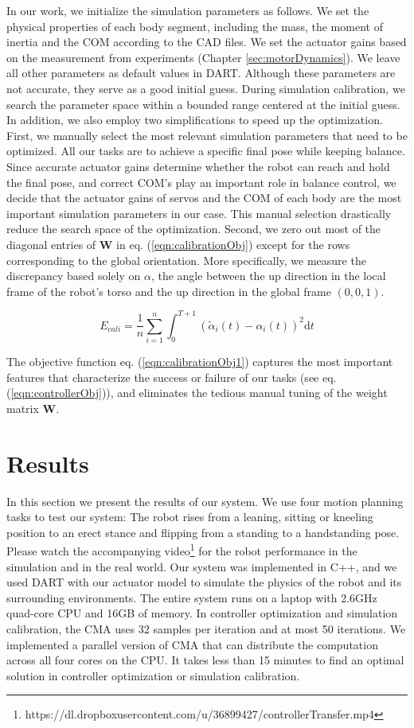 In our work, we initialize the simulation parameters as follows. We set the physical properties of each body segment, including the mass, the moment of inertia and the COM according to the CAD files. We set the actuator gains based on the measurement from experiments (Chapter \ref{sec:motorDynamics}). We leave all other parameters as default values in DART. Although these parameters are not accurate, they serve as a good initial guess. During simulation calibration, we search the parameter space within a bounded range centered at the initial guess. In addition, we also employ two simplifications to speed up the optimization. First, we manually select the most relevant simulation parameters that need to be optimized. All our tasks are to achieve a specific final pose while keeping balance. Since accurate actuator gains determine whether the robot can reach and hold the final pose, and correct COM's play an important role in balance control, we decide that the actuator gains of servos and the COM of each body are the most important simulation parameters in our case. This manual selection drastically reduce the search space of the optimization. Second, we zero out most of the diagonal entries of $\mathbf{W}$ in eq. (\ref{eqn:calibrationObj}) except for the rows corresponding to the global orientation. More specifically, we measure the discrepancy based solely on $\alpha$, the angle between the up direction in the local frame of the robot's torso and the up direction in the global frame $(0,0,1)$.

\begin{equation}
  E_{cali}=\frac{1}{n}\sum_{i=1}^{n}\int_{0}^{T+1}(\tilde{\alpha}_i(t)-\alpha_i(t))^2\mathrm{d}t
  \label{eqn:calibrationObj1}
\end{equation}

The objective function eq. (\ref{eqn:calibrationObj1}) captures the most important features that characterize the success or failure of our tasks (see eq.(\ref{eqn:controllerObj})), and eliminates the tedious manual tuning of the weight matrix $\mathbf{W}$.

\section{Results}
In this section we present the results of our system. We use four motion planning tasks to test our system: The robot rises from a leaning, sitting or kneeling position to an erect stance and flipping from a standing to a handstanding pose. Please watch the accompanying video\footnote{https://dl.dropboxusercontent.com/u/36899427/controllerTransfer.mp4} for the robot performance in the simulation and in the real world. Our system was implemented in C++, and we used DART with our actuator model to simulate the physics of the robot and its surrounding environments. The entire system runs on a laptop with 2.6GHz quad-core CPU and 16GB of memory. In controller optimization and simulation calibration, the CMA uses 32 samples per iteration and at most 50 iterations. We implemented a parallel version of CMA that can distribute the computation across all four cores on the CPU. It takes less than 15 minutes to find an optimal solution in controller optimization or simulation calibration.

